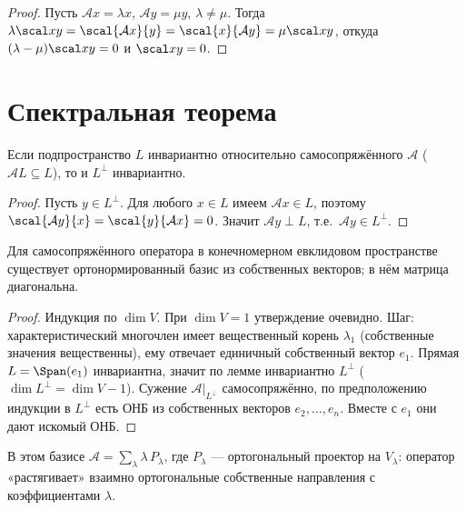 \begin{proof}
Пусть $\mathcal Ax=\lambda x$, $\mathcal Ay=\mu y$, $\lambda\ne\mu$. Тогда
$\lambda\scal xy=\scal{\mathcal Ax}{y}=\scal{x}{\mathcal Ay}=\mu\scal xy$, откуда
$(\lambda-\mu)\scal xy=0$ и $\scal xy=0$.
\end{proof}

\section{Спектральная теорема}

\begin{lemma}
Если подпространство $L$ инвариантно относительно самосопряжённого $\mathcal A$
($\mathcal A L\subseteq L$), то и $L^\perp$ инвариантно.
\end{lemma}

\begin{proof}
Пусть $y\in L^\perp$. Для любого $x\in L$ имеем $\mathcal Ax\in L$, поэтому
$\scal{\mathcal Ay}{x}=\scal{y}{\mathcal Ax}=0$. Значит $\mathcal Ay\perp L$, т.е.\
$\mathcal Ay\in L^\perp$.
\end{proof}

\begin{theorem}
Для самосопряжённого оператора в конечномерном евклидовом пространстве существует ортонормированный
базис из собственных векторов; в нём матрица диагональна.
\end{theorem}

\begin{proof}
Индукция по $\dim V$. При $\dim V=1$ утверждение очевидно. Шаг: характеристический многочлен имеет
вещественный корень $\lambda_1$ (собственные значения вещественны), ему отвечает единичный
собственный вектор $e_1$. Прямая $L=\Span(e_1)$ инвариантна, значит по лемме инвариантно
$L^\perp$ ($\dim L^\perp=\dim V-1$). Сужение $\mathcal A|_{L^\perp}$ самосопряжённо, по
предположению индукции в $L^\perp$ есть ОНБ из собственных векторов $e_2,\dots,e_n$. Вместе с $e_1$
они дают искомый ОНБ.
\end{proof}

\begin{remark}
В этом базисе $\mathcal A=\sum_\lambda\lambda\,P_\lambda$, где $P_\lambda$ — ортогональный проектор
на $V_\lambda$: оператор «растягивает» взаимно ортогональные собственные направления с
коэффициентами $\lambda$.
\end{remark}

